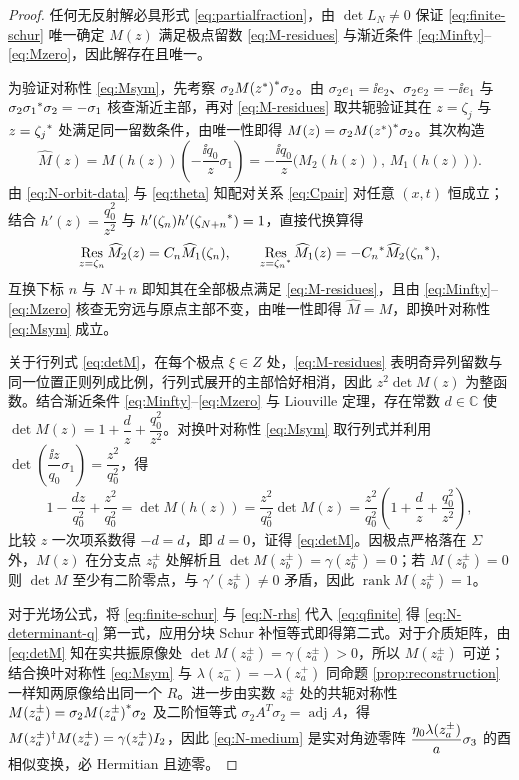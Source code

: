 \begin{proof}
任何无反射解必具形式 \eqref{eq:partialfraction}，由 $\det L_N\ne0$ 保证 \eqref{eq:finite-schur} 唯一确定 $M(z)$ 满足极点留数 \eqref{eq:M-residues} 与渐近条件 \eqref{eq:Minfty}--\eqref{eq:Mzero}，因此解存在且唯一。

为验证对称性 \eqref{eq:Msym}，先考察 $\sigma_2{M({z}^{*})}^{*}\sigma_2$。由 $\sigma_2 e_1=\ii e_2$、$\sigma_2 e_2=-\ii e_1$ 与 $\sigma_2{\sigma_1}^{*}\sigma_2=-\sigma_1$ 核查渐近主部，再对 \eqref{eq:M-residues} 取共轭验证其在 $z=\zeta_j$ 与 $z={\zeta_j}^{*}$ 处满足同一留数条件，由唯一性即得 $M(z)=\sigma_2{M({z}^{*})}^{*}\sigma_2$。其次构造
\begin{equation*}
\widehat M(z)=M(h(z))\left(-\dfrac{\ii q_0}{z}\sigma_1\right)
=-\dfrac{\ii q_0}{z}\bigl(M_2(h(z)),\,M_1(h(z))\bigr).
\end{equation*}
由 \eqref{eq:N-orbit-data} 与 \eqref{eq:theta} 知配对关系 \eqref{eq:Cpair} 对任意 $(x,t)$ 恒成立；结合 $h'(z)=\dfrac{q_0^2}{z^2}$ 与 $h'(\zeta_n)h'({\zeta_{N+n}}^{*})=1$，直接代换算得
\begin{equation*}
\operatorname*{Res}\limits_{z=\zeta_n}\widehat M_2(z)=C_n\widehat M_1(\zeta_n),\qquad
\operatorname*{Res}\limits_{z={\zeta_n}^{*}}\widehat M_1(z)=-{C_n}^{*}\widehat M_2({\zeta_n}^{*}),
\end{equation*}
互换下标 $n$ 与 $N+n$ 即知其在全部极点满足 \eqref{eq:M-residues}，且由 \eqref{eq:Minfty}--\eqref{eq:Mzero} 核查无穷远与原点主部不变，由唯一性即得 $\widehat M=M$，即换叶对称性 \eqref{eq:Msym} 成立。

关于行列式 \eqref{eq:detM}，在每个极点 $\xi\in Z$ 处，\eqref{eq:M-residues} 表明奇异列留数与同一位置正则列成比例，行列式展开的主部恰好相消，因此 $z^2\det M(z)$ 为整函数。结合渐近条件 \eqref{eq:Minfty}--\eqref{eq:Mzero} 与 Liouville 定理，存在常数 $d\in\mathbb C$ 使 $\det M(z)=1+\dfrac{d}{z}+\dfrac{q_0^2}{z^2}$。对换叶对称性 \eqref{eq:Msym} 取行列式并利用 $\det\left(\dfrac{\ii z}{q_0}\sigma_1\right)=\dfrac{z^2}{q_0^2}$，得
\begin{equation*}
1-\dfrac{dz}{q_0^2}+\dfrac{z^2}{q_0^2}
=\det M(h(z))=\dfrac{z^2}{q_0^2}\det M(z)
=\dfrac{z^2}{q_0^2}\left(1+\dfrac{d}{z}+\dfrac{q_0^2}{z^2}\right),
\end{equation*}
比较 $z$ 一次项系数得 $-d=d$，即 $d=0$，证得 \eqref{eq:detM}。因极点严格落在 $\Sigma$ 外，$M(z)$ 在分支点 $z_b^\pm$ 处解析且 $\det M(z_b^\pm)=\gamma(z_b^\pm)=0$；若 $M(z_b^\pm)=0$ 则 $\det M$ 至少有二阶零点，与 $\gamma'(z_b^\pm)\ne0$ 矛盾，因此 $\operatorname{rank}M(z_b^\pm)=1$。

对于光场公式，将 \eqref{eq:finite-schur} 与 \eqref{eq:N-rhs} 代入 \eqref{eq:qfinite} 得 \eqref{eq:N-determinant-q} 第一式，应用分块 Schur 补恒等式即得第二式。对于介质矩阵，由 \eqref{eq:detM} 知在实共振原像处 $\det M(z_a^\pm)=\gamma(z_a^\pm)>0$，所以 $M(z_a^\pm)$ 可逆；结合换叶对称性 \eqref{eq:Msym} 与 $\lambda(z_a^-)=-\lambda(z_a^+)$ 同命题 \ref{prop:reconstruction} 一样知两原像给出同一个 $R$。进一步由实数 $z_a^\pm$ 处的共轭对称性 $M(z_a^\pm)=\sigma_2{M(z_a^\pm)}^{*}\sigma_2$ 及二阶恒等式 $\sigma_2 A^T\sigma_2=\operatorname{adj}A$，得 $M(z_a^\pm)^\dagger M(z_a^\pm)=\gamma(z_a^\pm)I_2$，因此 \eqref{eq:N-medium} 是实对角迹零阵 $\dfrac{\eta_0\lambda(z_a^\pm)}{a}\sigma_3$ 的酉相似变换，必 Hermitian 且迹零。
\end{proof}

